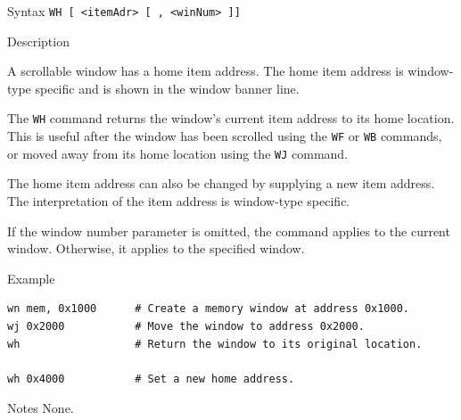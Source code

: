 %
%
\pagebreak
{}

\begin{iPageDescEntry}{Syntax}
\texttt{WH [ <itemAdr> [ , <winNum> ]]} \\
\end{iPageDescEntry}

\begin{iPageDescEntry}{Description}

A scrollable window has a home item address. The home item address is window-type specific and is shown in the window banner line.

The \texttt{WH} command returns the window’s current item address to its home location. This is useful after the window has been scrolled using the \texttt{WF} or \texttt{WB} commands, or moved away from its home location using the \texttt{WJ} command.

The home item address can also be changed by supplying a new item address. The interpretation of the item address is window-type specific.

If the window number parameter is omitted, the command applies to the current window. Otherwise, it applies to the specified window.

\end{iPageDescEntry}

\begin{iPageDescOpEntry}{Example}
\begin{lstlisting}[style=iPageOpStyle]
wn mem, 0x1000      # Create a memory window at address 0x1000.
wj 0x2000           # Move the window to address 0x2000.
wh                  # Return the window to its original location.

wh 0x4000           # Set a new home address.
\end{lstlisting}
\end{iPageDescOpEntry}

\begin{iPageDescEntry}{Notes}
None.
\end{iPageDescEntry}

